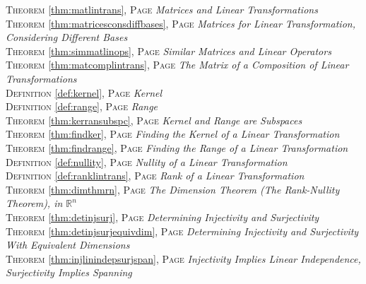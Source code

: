 \begin{multicols}{2}
{\textsc{Theorem} \ref{thm:matlintrans}, \textsc{Page} \pageref{thm:matlintrans} \textit{Matrices and Linear Transformations} \\
\textsc{Theorem} \ref{thm:matricesconsdiffbases}, \textsc{Page} \pageref{thm:matricesconsdiffbases} \textit{Matrices for Linear Transformation, Considering Different Bases} \\
\textsc{Theorem} \ref{thm:simmatlinops}, \textsc{Page} \pageref{thm:simmatlinops} \textit{Similar Matrices and Linear Operators} \\
\textsc{Theorem} \ref{thm:matcomplintrans}, \textsc{Page} \pageref{thm:matcomplintrans} \textit{The Matrix of a Composition of Linear Transformations} \\
\textsc{Definition} \ref{def:kernel}, \textsc{Page} \pageref{def:kernel} \textit{Kernel} \\
\textsc{Definition} \ref{def:range}, \textsc{Page} \pageref{def:range} \textit{Range} \\
\textsc{Theorem} \ref{thm:kerransubspc}, \textsc{Page} \pageref{thm:kerransubspc} \textit{Kernel and Range are Subspaces} \\
\textsc{Theorem} \ref{thm:findker}, \textsc{Page} \pageref{thm:findker} \textit{Finding the Kernel of a Linear Transformation} \\
\textsc{Theorem} \ref{thm:findrange}, \textsc{Page} \pageref{thm:findrange} \textit{Finding the Range of a Linear Transformation} \\
\textsc{Definition} \ref{def:nullity}, \textsc{Page} \pageref{def:nullity} \textit{Nullity of a Linear Transformation} \\
\textsc{Definition} \ref{def:ranklintrans}, \textsc{Page} \pageref{def:ranklintrans} \textit{Rank of a Linear Transformation} \\
\textsc{Theorem} \ref{thm:dimthmrn}, \textsc{Page} \pageref{thm:dimthmrn} \textit{The Dimension Theorem (The Rank-Nullity Theorem), in \(\mathbb {R}^n\)} \\
\textsc{Theorem} \ref{thm:detinjsurj}, \textsc{Page} \pageref{thm:detinjsurj} \textit{Determining Injectivity and Surjectivity} \\
\textsc{Theorem} \ref{thm:detinjsurjequivdim}, \textsc{Page} \pageref{thm:detinjsurjequivdim} \textit{Determining Injectivity and Surjectivity With Equivalent Dimensions} \\
\textsc{Theorem} \ref{thm:injlinindepsurjspan}, \textsc{Page} \pageref{thm:injlinindepsurjspan} \textit{Injectivity Implies Linear Independence, Surjectivity Implies Spanning} \\
}
\end{multicols}

